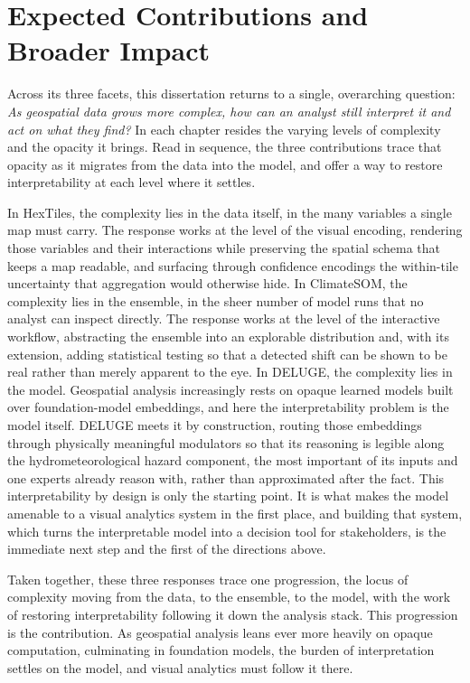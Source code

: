 \section{Expected Contributions and Broader Impact}
Across its three facets, this dissertation returns to a single, overarching question: \emph{As geospatial data grows more complex, how can an analyst still interpret it and act on what they find? }
%
In each chapter resides the varying levels of complexity and the opacity it brings.
Read in sequence, the three contributions trace that opacity as it migrates from the data into the model, and offer a way to restore interpretability at each level where it settles.


In HexTiles, the complexity lies in the data itself, in the many variables a single map must carry. The response works at the level of the visual encoding, rendering those variables and their interactions while preserving the spatial schema that keeps a map readable, and surfacing through confidence encodings the within-tile uncertainty that aggregation would otherwise hide.
%
In ClimateSOM, the complexity lies in the ensemble, in the sheer number of model runs that no analyst can inspect directly. The response works at the level of the interactive workflow, abstracting the ensemble into an explorable distribution and, with its extension, adding statistical testing so that a detected shift can be shown to be real rather than merely apparent to the eye.
%
In DELUGE, the complexity lies in the model. Geospatial analysis increasingly rests on opaque learned models built over foundation-model embeddings, and here the interpretability problem is the model itself. DELUGE meets it by construction, routing those embeddings through physically meaningful modulators so that its reasoning is legible along the hydrometeorological hazard component, the most important of its inputs and one experts already reason with, rather than approximated after the fact. This interpretability by design is only the starting point. It is what makes the model amenable to a visual analytics system in the first place, and building that system, which turns the interpretable model into a decision tool for stakeholders, is the immediate next step and the first of the directions above.

Taken together, these three responses trace one progression, the locus of complexity moving from the data, to the ensemble, to the model, with the work of restoring interpretability following it down the analysis stack. This progression is the contribution. As geospatial analysis leans ever more heavily on opaque computation, culminating in foundation models, the burden of interpretation settles on the model, and visual analytics must follow it there.

